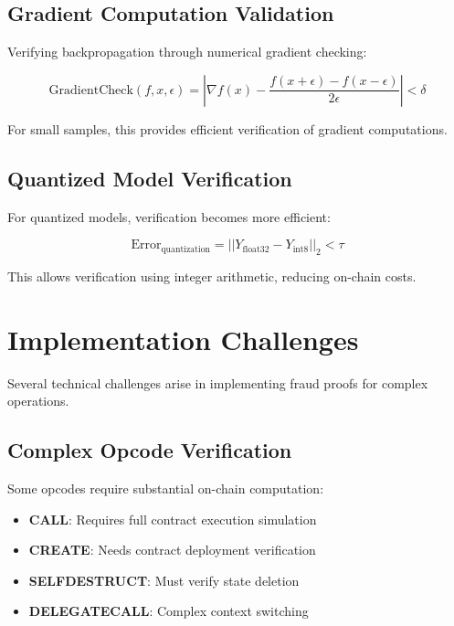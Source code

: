 \documentclass[11pt,a4paper]{article}
\theoremstyle{definition}
\begin{document}
\subsection{Gradient Computation Validation}

Verifying backpropagation through numerical gradient checking:

\begin{equation}
\text{GradientCheck}(f, x, \epsilon) = \left|\nabla f(x) - \frac{f(x+\epsilon) - f(x-\epsilon)}{2\epsilon}\right| < \delta
\end{equation}

For small samples, this provides efficient verification of gradient computations.

\subsection{Quantized Model Verification}

For quantized models, verification becomes more efficient:

\begin{equation}
\text{Error}_{\text{quantization}} = ||Y_{\text{float32}} - Y_{\text{int8}}||_2 < \tau
\end{equation}

This allows verification using integer arithmetic, reducing on-chain costs.

\section{Implementation Challenges}

Several technical challenges arise in implementing fraud proofs for complex operations.

\subsection{Complex Opcode Verification}

Some opcodes require substantial on-chain computation:

\begin{itemize}
    \item \textbf{CALL}: Requires full contract execution simulation
    \item \textbf{CREATE}: Needs contract deployment verification
    \item \textbf{SELFDESTRUCT}: Must verify state deletion
    \item \textbf{DELEGATECALL}: Complex context switching
\end{itemize}
\end{document}
